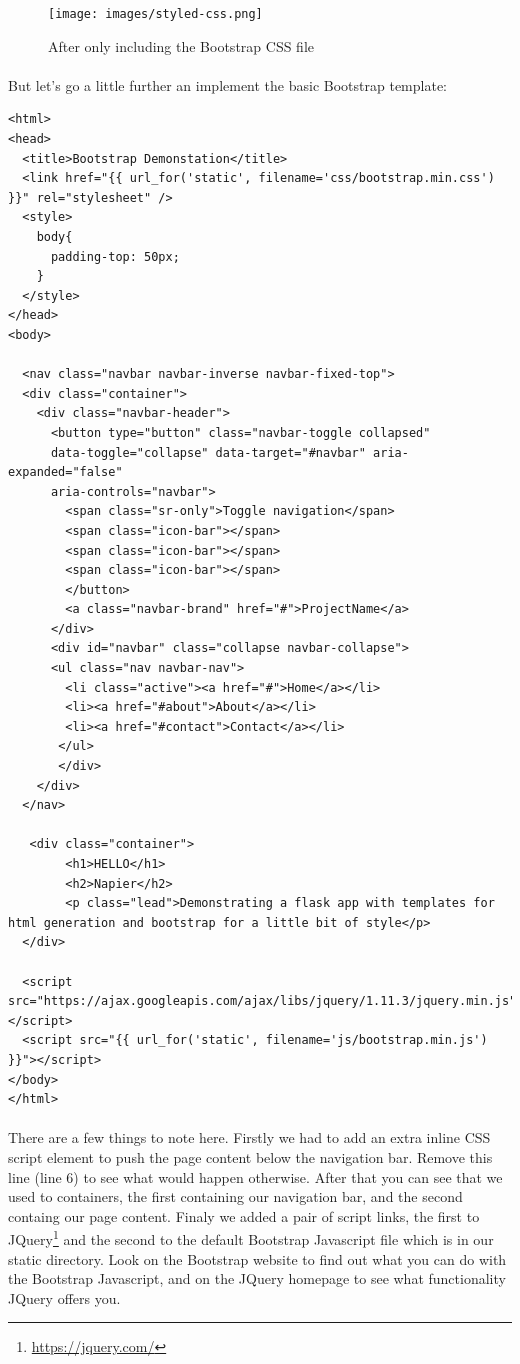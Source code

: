 \documentclass[12pt, a4paper, oneside]{book}
\begin{document}
{\begin{figure}[H]
\centering
\texttt{[image: images/styled-css.png]}
\caption{After only including the Bootstrap CSS file}
\label{fig:styled-css}
\end{figure}

\paragraph{} But let's go a little further an implement the basic Bootstrap template:

\begin{lstlisting}
<html>
<head>
  <title>Bootstrap Demonstation</title>
  <link href="{{ url_for('static', filename='css/bootstrap.min.css') }}" rel="stylesheet" />
  <style>
    body{ 
      padding-top: 50px;
    } 
  </style>
</head>
<body>

  <nav class="navbar navbar-inverse navbar-fixed-top">
  <div class="container">
    <div class="navbar-header">
      <button type="button" class="navbar-toggle collapsed"
      data-toggle="collapse" data-target="#navbar" aria-expanded="false"
      aria-controls="navbar">
        <span class="sr-only">Toggle navigation</span>
        <span class="icon-bar"></span>
        <span class="icon-bar"></span>
        <span class="icon-bar"></span>
        </button>
        <a class="navbar-brand" href="#">ProjectName</a>
      </div>
      <div id="navbar" class="collapse navbar-collapse">
      <ul class="nav navbar-nav">
        <li class="active"><a href="#">Home</a></li>
        <li><a href="#about">About</a></li>
        <li><a href="#contact">Contact</a></li>
       </ul>
       </div>
    </div>
  </nav>

   <div class="container">
        <h1>HELLO</h1>
        <h2>Napier</h2>
        <p class="lead">Demonstrating a flask app with templates for html generation and bootstrap for a little bit of style</p>
  </div>

  <script src="https://ajax.googleapis.com/ajax/libs/jquery/1.11.3/jquery.min.js"></script>
  <script src="{{ url_for('static', filename='js/bootstrap.min.js') }}"></script>
</body>
</html>
\end{lstlisting}

\paragraph{} There are a few things to note here. Firstly we had to add an extra inline CSS script element to push the page content below the navigation bar. Remove this line (line 6) to see what would happen otherwise. After that you can see that we used to containers, the first containing our navigation bar, and the second containg our page content. Finaly we added a pair of script links, the first to JQuery\footnote{\url{https://jquery.com/}} and the second to the default Bootstrap Javascript file which is in our static directory. Look on the Bootstrap website to find out what you can do with the Bootstrap Javascript, and on the JQuery homepage to see what functionality JQuery offers you.

}
\end{document}
